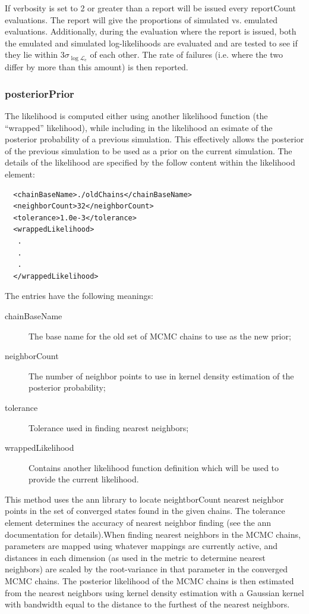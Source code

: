 If verbosity is set to 2 or greater than a report will be issued every {\normalfont \ttfamily reportCount} evaluations. The report will give the proportions of simulated vs. emulated evaluations. Additionally, during the evaluation where the report is issued, both the emulated and simulated log-likelihoods are evaluated and are tested to see if they lie within $3 \sigma_{\log\mathcal{L}_{\mathrm e}}$ of each other. The rate of failures (i.e. where the two differ by more than this amount) is then reported.

\subsubsection{posteriorPrior}

The likelihood is computed either using another likelihood function (the ``wrapped'' likelihood), while including in the likelihood an esimate of the posterior probability of a previous simulation. This effectively allows the posterior of the previous simulation to be used as a prior on the current simulation. The details of the likelihood are specified by the follow content within the {\normalfont \ttfamily likelihood} element:
\begin{verbatim}
  <chainBaseName>./oldChains</chainBaseName>
  <neighborCount>32</neighborCount>
  <tolerance>1.0e-3</tolerance>
  <wrappedLikelihood>
   .
   .
   .
  </wrappedLikelihood>
\end{verbatim}

The entries have the following meanings:
\begin{description}
\item[{\normalfont \ttfamily chainBaseName}] The base name for the old set of MCMC chains to use as the new prior;
\item[{\normalfont \ttfamily neighborCount}] The number of neighbor points to use in kernel density estimation of the posterior probability;
\item[{\normalfont \ttfamily tolerance}] Tolerance used in finding nearest neighbors;
\item[{\normalfont \ttfamily wrappedLikelihood}] Contains another likelihood function definition which will be used to provide the current likelihood.
\end{description}

This method uses the \gls{ann} library to locate {\normalfont \ttfamily neightborCount} nearest neighbor points in the set of converged states found in the given chains. The {\normalfont \ttfamily tolerance} element determines the accuracy of nearest neighbor finding (see the \gls{ann} documentation for details).When finding nearest neighbors in the MCMC chains, parameters are mapped using whatever mappings are currently active, and distances in each dimension (as used in the metric to determine nearest neighbors) are scaled by the root-variance in that parameter in the converged MCMC chains. The posterior likelihood of the MCMC chains is then estimated from the nearest neighbors using kernel density estimation with a Gaussian kernel with bandwidth equal to the distance to the furthest of the nearest neighbors.

